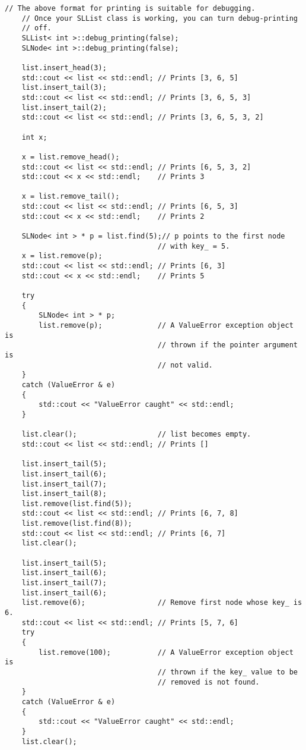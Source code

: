 \begin{Verbatim}[frame=single,commandchars=\~\@\$,fontsize=\footnotesize]
    // The above format for printing is suitable for debugging.
    // Once your SLList class is working, you can turn debug-printing
    // off.
    SLList< int >::debug_printing(false);
    SLNode< int >::debug_printing(false);

    list.insert_head(3);
    std::cout << list << std::endl; // Prints [3, 6, 5]
    list.insert_tail(3);
    std::cout << list << std::endl; // Prints [3, 6, 5, 3]
    list.insert_tail(2);
    std::cout << list << std::endl; // Prints [3, 6, 5, 3, 2]

    int x;

    x = list.remove_head();
    std::cout << list << std::endl; // Prints [6, 5, 3, 2]
    std::cout << x << std::endl;    // Prints 3

    x = list.remove_tail();
    std::cout << list << std::endl; // Prints [6, 5, 3]
    std::cout << x << std::endl;    // Prints 2

    SLNode< int > * p = list.find(5);// p points to the first node
                                    // with key_ = 5.
    x = list.remove(p);
    std::cout << list << std::endl; // Prints [6, 3]
    std::cout << x << std::endl;    // Prints 5

    try
    {
        SLNode< int > * p;
        list.remove(p);             // A ValueError exception object is
                                    // thrown if the pointer argument is
                                    // not valid.
    }
    catch (ValueError & e)
    {
        std::cout << "ValueError caught" << std::endl;
    }

    list.clear();                   // list becomes empty.
    std::cout << list << std::endl; // Prints []

    list.insert_tail(5);
    list.insert_tail(6);
    list.insert_tail(7);
    list.insert_tail(8);
    list.remove(list.find(5));
    std::cout << list << std::endl; // Prints [6, 7, 8]
    list.remove(list.find(8));
    std::cout << list << std::endl; // Prints [6, 7]
    list.clear();

    list.insert_tail(5);
    list.insert_tail(6);
    list.insert_tail(7);
    list.insert_tail(6);
    list.remove(6);                 // Remove first node whose key_ is 6.
    std::cout << list << std::endl; // Prints [5, 7, 6]
    try
    {
        list.remove(100);           // A ValueError exception object is
                                    // thrown if the key_ value to be 
                                    // removed is not found.
    }
    catch (ValueError & e)
    {
        std::cout << "ValueError caught" << std::endl;
    }
    list.clear();


\end{Verbatim}
